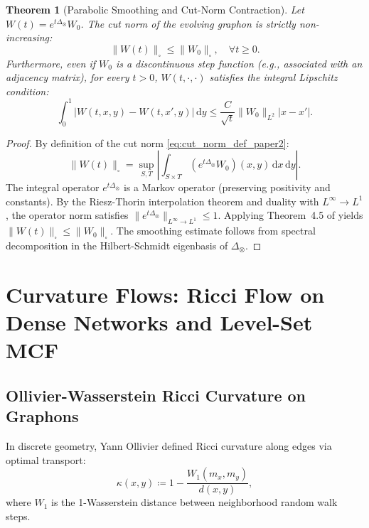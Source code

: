 \documentclass[11pt,a4paper,reqno]{amsart}
\newtheorem{theorem}{Theorem}[section]
\theoremstyle{definition}
\numberwithin{equation}{section}
\newcommand{\cutnorm}[1]{\|#1\|_{\square}}
\newcommand{\dif}{\,\mathrm{d}}
\begin{document}
\begin{theorem}[Parabolic Smoothing and Cut-Norm Contraction]
\label{thm:heat_smoothing}
Let $W(t) = e^{t \Delta_\otimes} W_0$. The cut norm of the evolving graphon is strictly non-increasing:
\begin{equation}
    \cutnorm{W(t)} \le \cutnorm{W_0}, \quad \forall t \ge 0.
\end{equation}
Furthermore, even if $W_0$ is a discontinuous step function (e.g., associated with an adjacency matrix), for every $t > 0$, $W(t, \cdot, \cdot)$ satisfies the integral Lipschitz condition:
\begin{equation}
    \int_0^1 |W(t, x, y) - W(t, x', y)| \dif y \le \frac{C}{\sqrt{t}} \|W_0\|_{L^2} |x - x'|.
\end{equation}
\end{theorem}
\begin{proof}
By definition of the cut norm \eqref{eq:cut_norm_def_paper2}:
\begin{equation}
    \cutnorm{W(t)} = \sup_{S, T} \left| \int_{S \times T} (e^{t \Delta_\otimes} W_0)(x, y) \dif x \dif y \right|.
\end{equation}
The integral operator $e^{t \Delta_\otimes}$ is a Markov operator (preserving positivity and constants). By the Riesz-Thorin interpolation theorem and duality with $L^\infty \to L^1$, the operator norm satisfies $\|e^{t \Delta_\otimes}\|_{L^\infty \to L^1} \le 1$. Applying Theorem~4.5 of \cite{turing2026beyond} yields $\cutnorm{W(t)} \le \cutnorm{W_0}$. The smoothing estimate follows from spectral decomposition in the Hilbert-Schmidt eigenbasis of $\Delta_\otimes$.
\end{proof}

\section{Curvature Flows: Ricci Flow on Dense Networks and Level-Set MCF}
\label{sec:curvature_flows}

\subsection{Ollivier-Wasserstein Ricci Curvature on Graphons}
In discrete geometry, Yann Ollivier \cite{ollivier2009ricci} defined Ricci curvature along edges via optimal transport:
\begin{equation}
    \kappa(x, y) \coloneqq 1 - \frac{W_1(m_x, m_y)}{d(x, y)},
\end{equation}
where $W_1$ is the 1-Wasserstein distance between neighborhood random walk steps.
\end{document}
